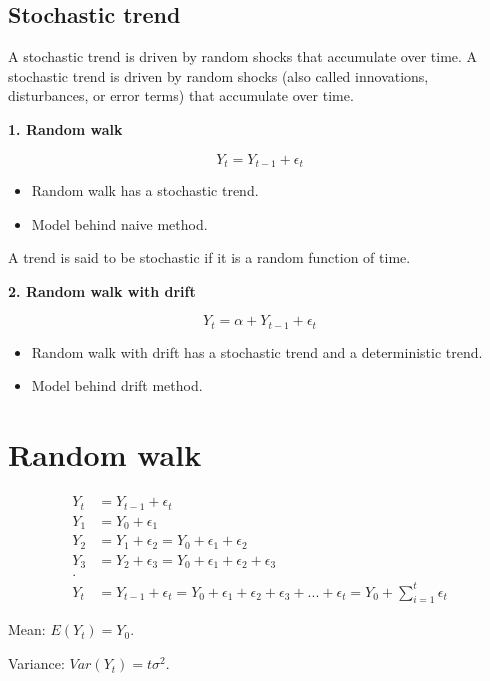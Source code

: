 \documentclass[
  11pt,
  a4paper,
]{report}
\begin{document}
\subsection{Stochastic trend}\label{stochastic-trend}

A stochastic trend is driven by random shocks that accumulate over time.
A stochastic trend is driven by random shocks (also called innovations,
disturbances, or error terms) that accumulate over time.

\textbf{1. Random walk}

\[Y_t = Y_{t-1} + \epsilon_t\]

\begin{itemize}
\item
  Random walk has a stochastic trend.
\item
  Model behind naive method.
\end{itemize}

A trend is said to be stochastic if it is a random function of time.

\textbf{2. Random walk with drift}

\[Y_t = \alpha +  Y_{t-1} + \epsilon_t\]

\begin{itemize}
\item
  Random walk with drift has a stochastic trend and a deterministic
  trend.
\item
  Model behind drift method.
\end{itemize}

\section{Random walk}\label{random-walk-1}

\[
\begin{aligned}
  Y_t &= Y_{t-1} + \epsilon_t \\
     Y_1    &= Y_0 + \epsilon_1 \\
         Y_2 &=  Y_1 + \epsilon_2=Y_0 + \epsilon_1 + \epsilon_2\\
          Y_3 &=  Y_2 + \epsilon_3=Y_0 + \epsilon_1 + \epsilon_2 +\epsilon_3\\
          .   \\
          Y_t &=Y_{t-1} + \epsilon_t=Y_0 + \epsilon_1 + \epsilon_2 + \epsilon_3 +...+ \epsilon_t = Y_0 + \sum_{i=1}^{t} \epsilon_t
\end{aligned}
\]

Mean: \(E(Y_t) = Y_0\).

Variance: \(Var(Y_t)=t \sigma^2\).
\end{document}
